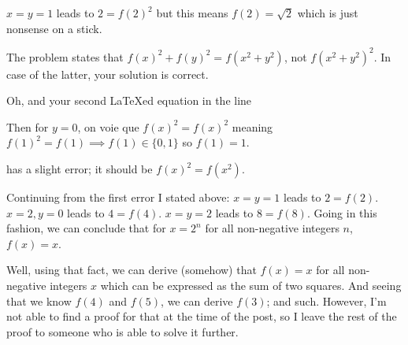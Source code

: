 \begin{solution}
	\begin{tcolorbox}$x=y=1$ leads to $2=f(2)^2$ but this means $f(2)=\sqrt{2}$ which is just nonsense on a stick.\end{tcolorbox}
The problem states that $f(x)^2 + f(y)^2 = f(x^2+y^2)$, not $f(x^2+y^2)^2$. In case of the latter, your solution is correct.

Oh, and your second LaTeXed equation in the line
\begin{tcolorbox}Then for $y=0$, on voie que $f(x)^2=f(x)^2$ meaning $f(1)^2=f(1)\implies f(1)\in\{0,1\}$ so $f(1)=1$.\end{tcolorbox}
has a slight error; it should be $f(x)^2 = f(x^2)$.

Continuing from the first error I stated above:
$x=y=1$ leads to $2=f(2)$. $x=2,y=0$ leads to $4=f(4)$. $x=y=2$ leads to $8=f(8)$. Going in this fashion, we can conclude that for $x=2^n$ for all non-negative integers $n$, $f(x) = x$.

Well, using that fact, we can derive (somehow) that $f(x)=x$ for all non-negative integers $x$ which can be expressed as the sum of two squares. And seeing that we know $f(4)$ and $f(5)$, we can derive $f(3)$; and such. However, I'm not able to find a proof for that at the time of the post, so I leave the rest of the proof to someone who is able to solve it further.
\end{solution}




